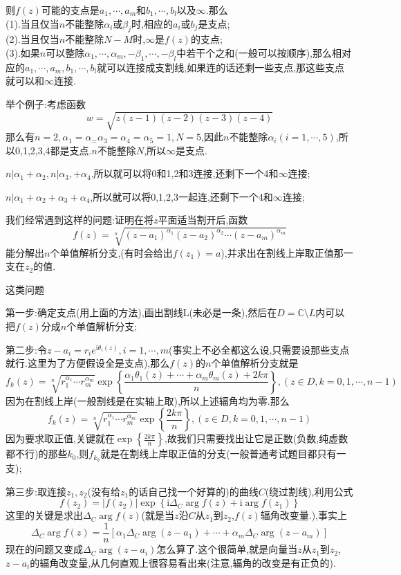 则$f(z)$可能的支点是$a_1,\cdots,a_m$和$b_1,\cdots,b_l$以及$\infty$.那么\\
(1).当且仅当$n$不能整除$\alpha_i$或$\beta_j$时,相应的$a_i$或$b_j$是支点;\\
(2).当且仅当$n$不能整除$N-M$时,$\infty$是$f(z)$的支点;\\
(3).如果$n$可以整除$\alpha_1,\cdots,\alpha_m,-\beta_1,\cdots,-\beta_l$中若干个之和(一般可以按顺序),那么相对应的$a_1,\cdots,a_m,b_1,\cdots,b_l$就可以连接成支割线,如果连的话还剩一些支点,那这些支点就可以和$\infty$连接.\par
举个例子:考虑函数
$$
w=\sqrt{z(z-1)(z-2)(z-3)(z-4)}
$$
那么有$n=2,\alpha_1=\alpha_=\alpha_3=\alpha_4=\alpha_5=1,N=5$,因此$n$不能整除$\alpha_i(i=1,\cdots,5)$,所以0,1,2,3,4都是支点.$n$不能整除$N$,所以$\infty$是支点.\par
$n|\alpha_1+\alpha_2,n|\alpha_3,+\alpha_4$,所以就可以将0和1,2和3连接,还剩下一个4和$\infty$连接;\par
$n|\alpha_1+\alpha_2+\alpha_3+\alpha_4$,所以就可以将0,1,2,3一起连,还剩下一个4和$\infty$连接;\par
我们经常遇到这样的问题:证明在将$z$平面适当割开后,函数
$$
f(z)=\sqrt[n]{(z-a_1)^{\alpha_1}(z-a_2)^{\alpha_2}\cdots(z-a_m)^{\alpha_m}}
$$
能分解出$n$个单值解析分支,(有时会给出$f(z_1)=a$),并求出在割线上岸取正值那一支在$z_2$的值.\par
这类问题\par
第一步:确定支点(用上面的方法),画出割线L(未必是一条),然后在$D=\mathbb{C}\setminus L$内可以把$f(z)$分成$n$个单值解析分支;\par
第二步:令$z-a_i=r_ie^{\mathrm{i}\theta_i(z)},i=1,\cdots,m$(事实上不必全都这么设,只需要设那些支点就行.这里为了方便假设全是支点),那么$f(z)$的$n$个单值解析分支就是
$$
f_k(z)=\sqrt[n]{r_1^{\alpha_1}\cdots r_m^{\alpha_m}}\exp\left\{\frac{\alpha_1\theta_1(z)+\cdots+\alpha_m\theta_m(z)+2k\pi}{n}\right\},(z\in D,k=0,1,\cdots,n-1)
$$
因为在割线上岸(一般割线是在实轴上取),所以上述辐角均为零.那么
$$
f_k(z)=\sqrt[n]{r_1^{\alpha_1}\cdots r_m^{\alpha_m}}\exp\left\{\frac{2k\pi}{n}\right\},(z\in D,k=0,1,\cdots,n-1)
$$
因为要求取正值,关键就在$\exp\left\{\frac{2k\pi}{n}\right\}$,故我们只需要找出让它是正数(负数,纯虚数都不行)的那些$k_0$,则$f_{k_0}$就是在割线上岸取正值的分支(一般普通考试题目都只有一支);\par
第三步:取连接$z_1,z_2$(没有给$z_1$的话自己找一个好算的)的曲线$C$(绕过割线),利用公式
$$
f(z_2)=|f(z_2)|\exp\left\{\mathrm{i}\Delta_{C}\arg f(z)+\mathrm{i}\arg f(z_1)\right\}
$$
这里的关键是求出$\Delta_{C}\arg f(z)$(就是当$z$沿$C$从$z_1$到$z_2$,$f(z)$辐角改变量.),事实上
$$
\Delta_{C}\arg f(z)=\frac{1}{n}\left[\alpha_1\Delta_{C}\arg (z-a_1)+\cdots+\alpha_m\Delta_{C}\arg (z-a_m)\right]
$$
现在的问题又变成$\Delta_{C}\arg (z-a_i)$怎么算了.这个很简单,就是向量当$z$从$z_1$到$z_2$,$z-a_i$的辐角改变量,从几何直观上很容易看出来(注意,辐角的改变是有正负的).
